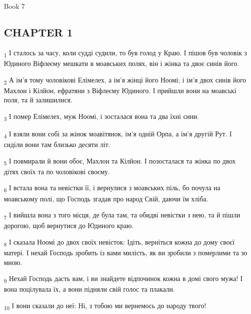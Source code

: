 Book 7
\subsection{CHAPTER 1}
\begin{tcolorbox}
\textsubscript{1} І сталось за часу, коли судді судили, то був голод у Краю. І пішов був чоловік з Юдиного Віфлеєму мешкати в моавських полях, він і жінка та двоє синів його.
\end{tcolorbox}
\begin{tcolorbox}
\textsubscript{2} А ім'я тому чоловікові Елімелех, а ім'я жінці його Ноомі; і ім'я двох синів його Махлон і Кілйон, ефратяни з Віфлеєму Юдиного. І прийшли вони на моавські поля, та й залишилися.
\end{tcolorbox}
\begin{tcolorbox}
\textsubscript{3} І помер Елімелех, муж Ноомі, і зосталася вона та два їхні сини.
\end{tcolorbox}
\begin{tcolorbox}
\textsubscript{4} І взяли вони собі за жінок моавітянок, ім'я одній Орпа, а ім'я другій Рут. І сиділи вони там близько десяти літ.
\end{tcolorbox}
\begin{tcolorbox}
\textsubscript{5} І повмирали й вони обоє, Махлон та Кілйон. І позосталася та жінка по двох дітях своїх та по чоловікові своєму.
\end{tcolorbox}
\begin{tcolorbox}
\textsubscript{6} І встала вона та невістки її, і вернулися з моавських піль, бо почула на моавському полі, що Господь згадав про народ Свій, даючи їм хліба.
\end{tcolorbox}
\begin{tcolorbox}
\textsubscript{7} І вийшла вона з того місця, де була там, та обидві невістки з нею, та й пішли дорогою, щоб вернутися до Юдиного краю.
\end{tcolorbox}
\begin{tcolorbox}
\textsubscript{8} І сказала Ноомі до двох своїх невісток: Ідіть, верніться кожна до дому своєї матері. І нехай Господь зробить із вами милість, як ви зробили з померлими та зо мною.
\end{tcolorbox}
\begin{tcolorbox}
\textsubscript{9} Нехай Господь дасть вам, і ви знайдете відпочинок кожна в домі свого мужа! І вона поцілувала їх, а вони підняли свій голос та плакали.
\end{tcolorbox}
\begin{tcolorbox}
\textsubscript{10} І вони сказали до неї: Ні, з тобою ми вернемось до народу твого!
\end{tcolorbox}
